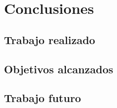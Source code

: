 \chapter{Conclusiones}
\section{Trabajo realizado}
\section{Objetivos alcanzados}
\section{Trabajo futuro}